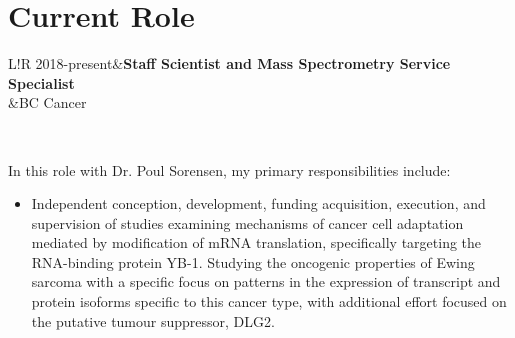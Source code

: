 \documentclass[11pt]{article}
\newcommand\VRule{\color{lightgray}\vrule width 0.5pt}
\begin{document}
\section*{Current Role}
\begin{tabular}{L!{\VRule}R}
	2018-present&\textbf{Staff Scientist and Mass Spectrometry Service Specialist}\\
	&BC Cancer\\
\end{tabular}\\

\begin{addmargin}[7.5em]{2em}%
	In this role with Dr. Poul Sorensen, my primary responsibilities include:
	\begin{itemize}
		\item Independent conception, development, funding acquisition, execution, and supervision of studies examining mechanisms of cancer cell adaptation mediated by modification of mRNA translation, specifically targeting the RNA-binding protein YB-1. Studying the oncogenic properties of Ewing sarcoma with a specific focus on patterns in the expression of transcript and protein isoforms specific to this cancer type, with additional effort focused on the putative tumour suppressor, DLG2.
	\end{itemize}
\end{addmargin}
\end{document}
